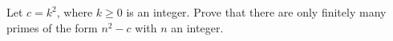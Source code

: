 Let $c=k^2$, where $k\ge0$ is an integer. Prove that there are only finitely many primes of the form $n^2-c$ with $n$ an integer.
